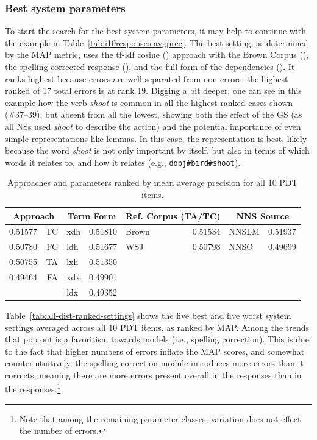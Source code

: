 \subsubsection{Best system parameters} 

To start the search for the best system parameters, it may help to
continue with the example in
Table~\ref{tab:i10responses-avgprec}. The best setting, as determined by the
MAP metric, uses the tf-idf cosine () approach with the Brown Corpus (),
the spelling corrected response (), and the full form of
the dependencies (). It ranks highest because errors are
well separated from non-errors; the highest ranked of 17 total errors
is at rank 19.  Digging a bit deeper, one can see in this example how
the verb \textit{shoot} is common in all the highest-ranked cases shown
(\#37--39), but absent from all the lowest, showing both the effect of
the GS (as all NSs used \textit{shoot} to describe the action) and the
potential importance of even simple representations like lemmas.  In
this case, the  representation is best, likely because the
word \textit{shoot} is not only important by itself, but also in terms
of which words it relates to, and how it relates (e.g.,
\texttt{dobj\#bird\#shoot}).

\begin{table}
\begin{center}
\begin{tabular}{|l|r||l|r||l|r||l|r|}
\hline
\multicolumn{2}{|c||}{Approach} & \multicolumn{2}{|c||}{Term Form} & \multicolumn{2}{|c||}{Ref. Corpus (TA/TC)} & \multicolumn{2}{|c|}{NNS Source} \\
\hline
\hline
0.51577 & TC & xdh & 0.51810 & Brown & 0.51534 & NNSLM & 0.51937 \\
\hline
0.50780 & FC & ldh & 0.51677 & WSJ & 0.50798 & NNSO & 0.49699 \\
\hline
0.50755 & TA & lxh & 0.51350 & & & & \\
\hline
0.49464 & FA & xdx & 0.49901 & & & & \\
\hline
& 	& ldx & 0.49352 &  &  &  & \\
\hline
\end{tabular}
\caption{Approaches and parameters ranked by mean average precision for all 10 PDT items.}
\label{tab:dist-ranked-parameters}
\end{center}
\end{table}

Table~\ref{tab:all-dist-ranked-settings} shows the five best and five
worst system settings averaged across all 10 PDT items, as ranked by
MAP. Among the trends that pop out is a favoritism
towards  models (i.e., spelling correction). This is due
to the fact that higher numbers of errors inflate the MAP scores, and
somewhat counterintuitively, the spelling correction module introduces
more errors than it corrects, meaning there are more errors present
overall in the  responses than in the 
responses.\footnote{Note that among the remaining parameter classes,
variation does not effect the number of errors.}

